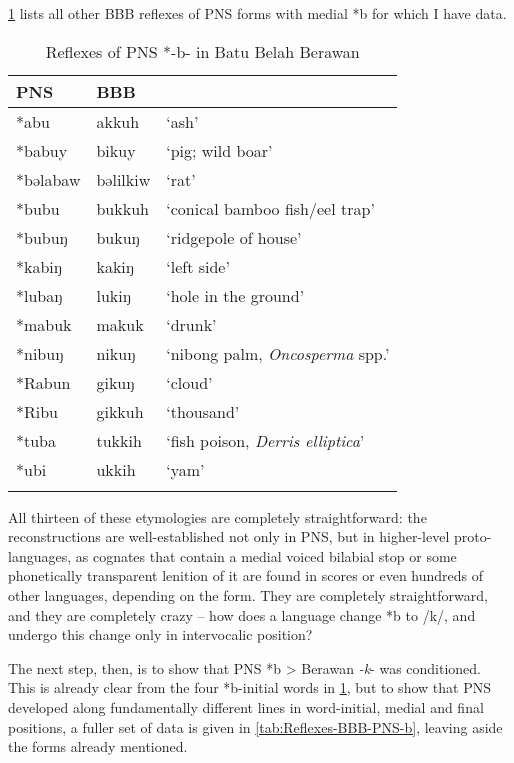 \documentclass[output=paper]{langscibook}
\begin{document}
\cref{tab:Reflexes-PNS-b} lists all other BBB reflexes of PNS forms with medial *b for which I have data.

\begin{table}
\caption{\label{tab:Reflexes-PNS-b}Reflexes of PNS *-b- in Batu Belah Berawan}
\begin{tabular}{lll}
\lsptoprule
PNS     &   BBB    & \\
\midrule
*abu      & akkuh       & `ash'     \\
*babuy    &   bikuy     & `pig; wild boar'  \\
*bəlabaw  &   bəlilkiw  & `rat'  \\
*bubu     &  bukkuh     & `conical bamboo fish/eel trap'     \\
*bubuŋ    &   bukuŋ     & `ridgepole of house'   \\
*kabiŋ    &   kakiŋ     & `left side'   \\
*lubaŋ    &   lukiŋ     & `hole in the ground'   \\
*mabuk    & makuk       & `drunk'     \\
*nibuŋ    &   nikuŋ     & `nibong palm, \textit{Oncosperma} spp.'   \\
*Rabun    & gikuŋ       & `cloud'     \\
*Ribu     &  gikkuh     & `thousand'   \\
*tuba     &  tukkih     & `fish poison, \textit{Derris elliptica}'   \\
*ubi      & ukkih       & `yam'     \\
\lspbottomrule
\end{tabular}
\end{table}

All thirteen of these etymologies are completely straightforward: the reconstructions are well-established not only in PNS, but in higher-level proto-lan\-guages, as cognates that contain a medial voiced bilabial stop or some phonetically transparent lenition of it are found in scores or even hundreds of other languages, depending on the form. They are completely straightforward, and they are completely crazy -- how does a language change *b to /k/, and undergo this change only in intervocalic position?

The next step, then, is to show that PNS *b > Berawan \textit{-k}- was conditioned. This is already clear from the four *b-initial words in \cref{tab:Reflexes-PNS-b}, but to show that PNS developed along fundamentally different lines in word-initial, medial and final positions, a fuller set of data is given in \cref{tab:Reflexes-BBB-PNS-b}, leaving aside the forms already mentioned.
\end{document}
